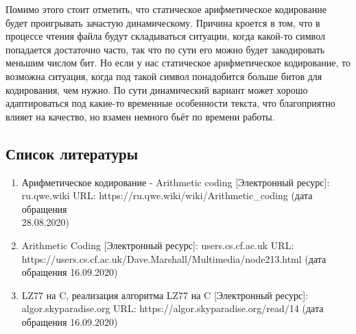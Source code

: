 \documentclass[12pt]{article}
\begin{document}
Помимо этого стоит отметить, что статическое арифметическое кодирование будет проигрывать зачастую динамическому. Причина кроется в том, что в процессе чтения файла будут складываться ситуации, когда какой-то символ попадается достаточно часто, так что по сути его можно будет закодировать меньшим числом бит. Но если у нас статическое арифметическое кодирование, то возможна ситуация, когда под такой символ понадобится больше битов для кодирования, чем нужно. По сути динамический вариант может хорошо адаптироваться под какие-то временные особенности текста, что благоприятно влияет на качество, но взамен немного бьёт по времени работы.



\subsection*{Список литературы}
\begin{enumerate}
	\item Арифметическое кодирование - Arithmetic coding [Электронный ресурс]:\\ ru.qwe.wiki URL: https://ru.qwe.wiki/wiki/Arithmetic\_coding (дата обращения\\ 28.08.2020)
	\item Arithmetic Coding [Электронный ресурс]: users.cs.cf.ac.uk URL:\\ https://users.cs.cf.ac.uk/Dave.Marshall/Multimedia/node213.html (дата обращения 16.09.2020)
	\item LZ77 на C, реализация алгоритма LZ77 на C [Электронный ресурс]:\\ algor.skyparadise.org URL: https://algor.skyparadise.org/read/14 (дата обращения 16.09.2020)
\end{enumerate}
\end{document}
